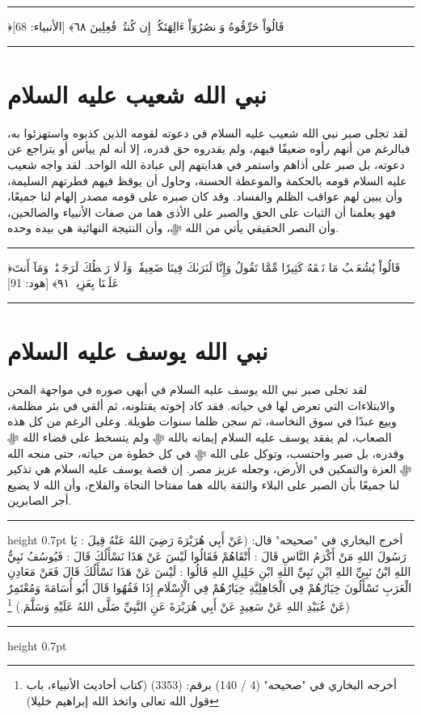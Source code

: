 \documentclass[12pt,openany]{book}
\newenvironment{quranblock}
  {\par\medskip\begin{center}\begin{minipage}{0.92\linewidth}\centering\quranfont\large\color{ink}\hrule\vspace{0.65em}}
  {\vspace{0.65em}\hrule\end{minipage}\end{center}\medskip}
\newenvironment{hadithblock}
  {\par\medskip\noindent\begin{minipage}{\linewidth}\hrule height 0.7pt \vspace{0.6em}\small}
  {\vspace{0.4em}\hrule height 0.7pt\end{minipage}\par\medskip}
\begin{document}
\begin{quranblock}
﴿قَالُواْ حَرِّقُوهُ وَٱنصُرُوٓاْ ءَالِهَتَكُمۡ إِن كُنتُمۡ فَٰعِلِينَ ٦٨﴾ [الأنبياء: 68]
\end{quranblock}

\section{نبي الله شعيب عليه السلام}
لقد تجلى صبر نبي الله شعيب عليه السلام في دعوته لقومه الذين كذبوه واستهزئوا به، فبالرغم من أنهم رأوه ضعيفًا فيهم، ولم يقدروه حق قدره، إلا أنه لم ييأس أو يتراجع عن دعوته، بل صبر على أذاهم واستمر في هدايتهم إلى عبادة الله الواحد. لقد واجه شعيب عليه السلام قومه بالحكمة والموعظة الحسنة، وحاول أن يوقظ فيهم فطرتهم السليمة، وأن يبين لهم عواقب الظلم والفساد. وقد كان صبره على قومه مصدر إلهام لنا جميعًا، فهو يعلمنا أن الثبات على الحق والصبر على الأذى هما من صفات الأنبياء والصالحين، وأن النصر الحقيقي يأتي من الله ﷻ، وأن النتيجة النهائية هي بيده وحده.

\begin{quranblock}
﴿قَالُواْ يَٰشُعَيۡبُ مَا نَفۡقَهُ كَثِيرٗا مِّمَّا تَقُولُ وَإِنَّا لَنَرَىٰكَ فِينَا ضَعِيفٗاۖ ‌وَلَوۡلَا ‌رَهۡطُكَ لَرَجَمۡنَٰكَۖ وَمَآ أَنتَ عَلَيۡنَا بِعَزِيزٖ ٩١﴾ [هود: 91]
\end{quranblock}

\section{نبي الله يوسف عليه السلام}
لقد تجلى صبر نبي الله يوسف عليه السلام في أبهى صوره في مواجهة المحن والابتلاءات التي تعرض لها في حياته. فقد كاد إخوته يقتلونه، ثم ألقي في بئر مظلمة، وبيع عبدًا في سوق النخاسة، ثم سجن ظلما سنوات طويلة. وعلى الرغم من كل هذه الصعاب، لم يفقد يوسف عليه السلام إيمانه بالله ﷻ ولم يتسخط على قضاء الله ﷻ وقدره، بل صبر واحتسب، وتوكل على الله ﷻ في كل خطوة من حياته، حتى منحه الله ﷻ العزة والتمكين في الأرض، وجعله عزيز مصر. إن قصة يوسف عليه السلام هي تذكير لنا جميعًا بأن الصبر على البلاء والثقة بالله هما مفتاحا النجاة والفلاح، وأن الله لا يضيع أجر الصابرين.

\begin{hadithblock}
أخرج البخاري في "صحيحه" قال: (عَنْ أَبِي هُرَيْرَةَ رَضِيَ اللهُ عَنْهُ قِيلَ : يَا رَسُولَ اللهِ مَنْ أَكْرَمُ النَّاسِ قَالَ : أَتْقَاهُمْ فَقَالُوا لَيْسَ عَنْ هَذَا نَسْأَلُكَ قَالَ : فَيُوسُفُ نَبِيُّ اللهِ ابْنُ نَبِيِّ اللهِ ابْنِ نَبِيِّ اللهِ ابْنِ خَلِيلِ اللهِ قَالُوا : لَيْسَ عَنْ هَذَا نَسْأَلُكَ قَالَ فَعَنْ مَعَادِنِ الْعَرَبِ تَسْأَلُونَ خِيَارُهُمْ فِي الْجَاهِلِيَّةِ خِيَارُهُمْ فِي الْإِسْلَامِ إِذَا فَقُهُوا قَالَ أَبُو أُسَامَةَ وَمُعْتَمِرٌ عَنْ عُبَيْدِ اللهِ عَنْ سَعِيدٍ عَنْ أَبِي هُرَيْرَةَ عَنِ النَّبِيِّ صَلَّى اللهُ عَلَيْهِ وَسَلَّمَ.) \footnote{أخرجه البخاري في "صحيحه" (4 / 140) برقم: (3353) (كتاب أحاديث الأنبياء، باب قول الله تعالى واتخذ الله إبراهيم خليلا)})
\end{hadithblock}
\end{document}
